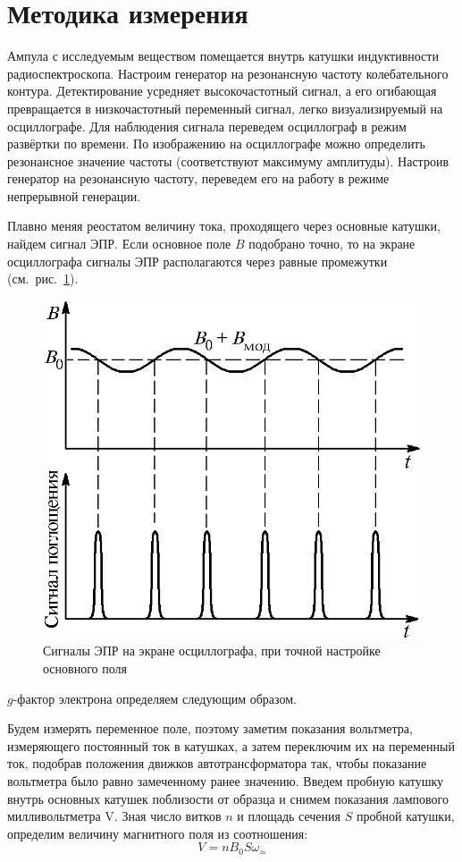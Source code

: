 \documentclass[reprint, nofootinbib, nobalancelastpage, 10pt]{revtex4-2}
\begin{document}
\section*{Методика измерения}

Ампула с исследуемым веществом помещается внутрь катушки индуктивности радиоспектроскопа.
Настроим генератор на резонансную частоту колебательного контура. Детектирование усредняет
высокочастотный сигнал, а его огибающая превращается в низкочастотный переменный сигнал,
легко визуализируемый на осциллографе. Для наблюдения сигнала переведем осциллограф в
режим развёртки по времени. По изображению на осциллографе можно определить резонансное
значение частоты (соответствуют максимуму амплитуды). Настроив генератор на резонансную
частоту, переведем его на работу в режиме непрерывной генерации.

Плавно меняя реостатом величину тока, проходящего через основные катушки, найдем сигнал
ЭПР. Если основное поле $B$ подобрано точно, то на экране осциллографа сигналы ЭПР
располагаются через равные промежутки (см.~рис.~\ref{img:3}).

\begin{figure}[h!]
	\includegraphics[width=0.8\linewidth]{3.png}
	\caption{Сигналы ЭПР на экране осциллографа, при точной настройке основного поля}
	\label{img:3}
\end{figure}

$g$-фактор электрона определяем следующим образом.

Будем измерять переменное поле, поэтому заметим показания вольтметра, измеряющего
постоянный ток в катушках, а затем переключим их на переменный ток, подобрав положения
движков автотрансформатора так, чтобы показание вольтметра было равно замеченному ранее
значению. Введем пробную катушку внутрь основных катушек поблизости от образца и снимем
показания лампового милливольтметра V. Зная число витков $n$ и площадь сечения $S$ пробной
катушки, определим величину магнитного поля из соотношения:
\begin{equation}
	\label{eq:B}
	V = n B_0 S \omega_{\simeq}
\end{equation}
\end{document}
